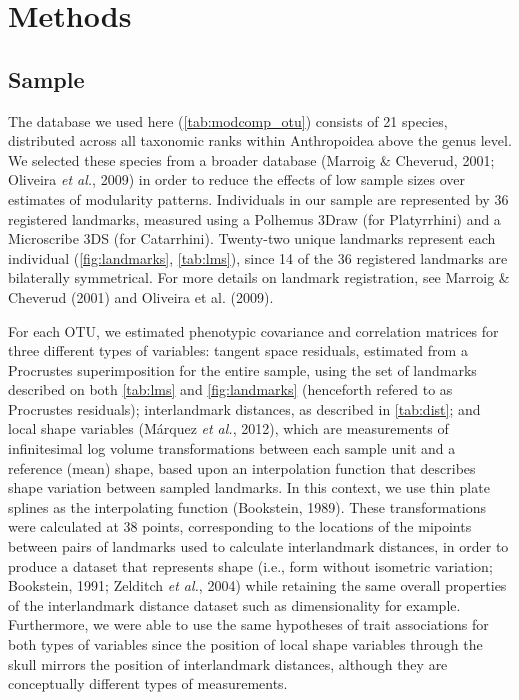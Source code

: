 \documentclass[12pt,twoside]{report}
\begin{document}
\section{Methods}\label{methods}

\subsection{Sample}\label{sample}

The database we used here (\autoref{tab:modcomp_otu}) consists of 21
species, distributed across all taxonomic ranks within Anthropoidea
above the genus level. We selected these species from a broader database
(Marroig \& Cheverud, 2001; Oliveira \emph{et al.}, 2009) in order to
reduce the effects of low sample sizes over estimates of modularity
patterns. Individuals in our sample are represented by 36 registered
landmarks, measured using a Polhemus 3Draw (for Platyrrhini) and a
Microscribe 3DS (for Catarrhini). Twenty-two unique landmarks represent
each individual (\autoref{fig:landmarks}, \autoref{tab:lms}), since 14
of the 36 registered landmarks are bilaterally symmetrical. For more
details on landmark registration, see Marroig \& Cheverud (2001) and
Oliveira et al. (2009).



For each OTU, we estimated phenotypic covariance and correlation
matrices for three different types of variables: tangent space
residuals, estimated from a Procrustes superimposition for the entire
sample, using the set of landmarks described on both \autoref{tab:lms}
and \autoref{fig:landmarks} (henceforth refered to as Procrustes
residuals); interlandmark distances, as described in \autoref{tab:dist};
and local shape variables (Márquez \emph{et al.}, 2012), which are
measurements of infinitesimal log volume transformations between each
sample unit and a reference (mean) shape, based upon an interpolation
function that describes shape variation between sampled landmarks. In
this context, we use thin plate splines as the interpolating function
(Bookstein, 1989). These transformations were calculated at 38 points,
corresponding to the locations of the mipoints between pairs of
landmarks used to calculate interlandmark distances, in order to produce
a dataset that represents shape (i.e., form without isometric variation;
Bookstein, 1991; Zelditch \emph{et al.}, 2004) while retaining the same
overall properties of the interlandmark distance dataset such as
dimensionality for example. Furthermore, we were able to use the same
hypotheses of trait associations for both types of variables since the
position of local shape variables through the skull mirrors the position
of interlandmark distances, although they are conceptually different
types of measurements.
\end{document}

